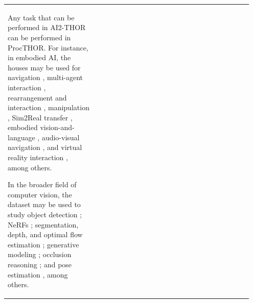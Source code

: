 \begin{longtable}{p{0.35\linewidth} |p{0.6\linewidth} }
    Any task that can be performed in AI2-THOR can be performed in ProcTHOR. For instance, in embodied AI, the houses may be used for navigation \cite{khandelwal2021simple, perez2021robot, wortsman2019learning, zhu2017target, wijmans2019dd, yitzhak2022clip, luo2022stubborn, Zheng2022TowardsOp}, multi-agent interaction \cite{jain2020cordial, jain2019two, team2021open}, rearrangement and interaction \cite{weihs2021visual, gadre2022continuous, gan2021threedworld, Chitnis2021LearningNe, Srivastava2021BEHAVIORBF}, manipulation \cite{manipulathor, ni2021towards, ehsani2022object, Xia2021ReLMoGenIM}, Sim2Real transfer \cite{Deitke2020RoboTHORAO, kadian2020sim2real, kumar2021rma}, embodied vision-and-language \cite{shridhar2020alfred, padmakumar2021teach, huang2022language, krantz2020beyond, gordon2018iqa, karamcheti2020learning}, audio-visual navigation \cite{chen2020soundspaces, gan2020look, chen2021savi}, and virtual reality interaction \cite{wu2021communicative, murnane2021simulator, higgins2022head}, among others.\newline

    In the broader field of computer vision, the dataset may be used to study object detection \cite{kotar2022interactron}; NeRFs \cite{mildenhall2020nerf, tancik2022block, greff2022kubric, li20223d}; segmentation, depth, and optimal flow estimation \cite{Feng2021DeepMO, greff2022kubric}; generative modeling \cite{kim2020learning, koh2021pathdreamer, koh2022simple}; occlusion reasoning \cite{ehsani2018segan}; and pose estimation \cite{Charco2021CameraPE}, among others.\newline


\end{longtable}
